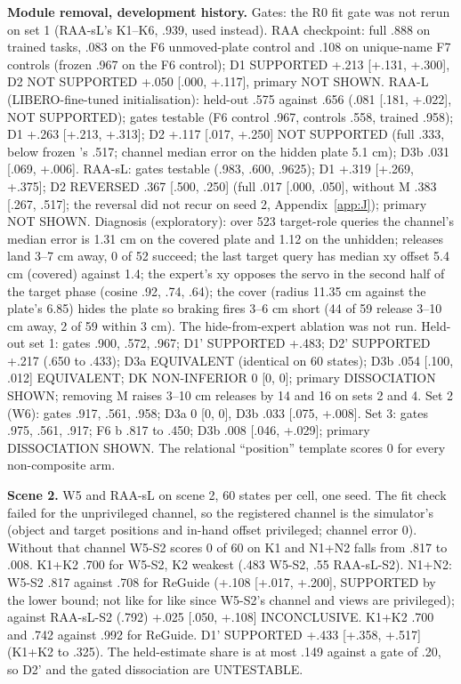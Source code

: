 \textbf{Module removal, development history.} Gates: the R0 fit gate was not rerun on set 1 (RAA-sL's K1--K6, .939, used instead). RAA checkpoint: full .888 on trained tasks, .083 on the F6 unmoved-plate control and .108 on unique-name F7 controls (frozen \pifive{} .967 on the F6 control); D1 SUPPORTED +.213 [+.131, +.300], D2 NOT SUPPORTED +.050 [.000, +.117], primary NOT SHOWN. RAA-L (LIBERO-fine-tuned initialisation): held-out .575 against .656 (\mi.081 [\mi.181, +.022], NOT SUPPORTED); gates testable (F6 control .967, controls .558, trained .958); D1 +.263 [+.213, +.313]; D2 +.117 [\mi.017, +.250] NOT SUPPORTED (full .333, below frozen \pifive's .517; channel median error on the hidden plate 5.1 cm); D3b \mi.031 [\mi.069, +.006]. RAA-sL: gates testable (.983, .600, .9625); D1 +.319 [+.269, +.375]; D2 REVERSED \mi.367 [\mi.500, \mi.250] (full .017 [.000, .050], without M .383 [.267, .517]; the reversal did not recur on seed 2, Appendix~\ref{app:J}); primary NOT SHOWN. Diagnosis (exploratory): over 523 target-role queries the channel's median error is 1.31 cm on the covered plate and 1.12 on the unhidden; releases land 3--7 cm away, 0 of 52 succeed; the last target query has median xy offset 5.4 cm (covered) against 1.4; the expert's xy opposes the servo in the second half of the target phase (cosine \mi.92, \mi.74, \mi.64); the cover (radius 11.35 cm against the plate's 6.85) hides the plate so braking fires 3--6 cm short (44 of 59 release 3--10 cm away, 2 of 59 within 3 cm). The hide-from-expert ablation was not run. Held-out set 1: gates .900, .572, .967; D1' SUPPORTED +.483; D2' SUPPORTED +.217 (.650 to .433); D3a EQUIVALENT (identical on 60 states); D3b \mi.054 [\mi.100, \mi.012] EQUIVALENT; DK NON-INFERIOR 0 [0, 0]; primary DISSOCIATION SHOWN; removing M raises 3--10 cm releases by 14 and 16 on sets 2 and 4. Set 2 (W6): gates .917, .561, .958; D3a 0 [0, 0], D3b \mi.033 [\mi.075, +.008]. Set 3: gates .975, .561, .917; F6 b .817 to .450; D3b \mi.008 [\mi.046, +.029]; primary DISSOCIATION SHOWN. The relational ``position'' template scores 0 for every non-composite arm.

\textbf{Scene 2.} W5 and RAA-sL on scene 2, 60 states per cell, one seed. The fit check failed for the unprivileged channel, so the registered channel is the simulator's (object and target positions and in-hand offset privileged; channel error 0). Without that channel W5-S2 scores 0 of 60 on K1 and N1+N2 falls from .817 to .008. K1+K2 .700 for W5-S2, K2 weakest (.483 W5-S2, .55 RAA-sL-S2). N1+N2: W5-S2 .817 against .708 for ReGuide (+.108 [+.017, +.200], SUPPORTED by the lower bound; not like for like since W5-S2's channel and views are privileged); against RAA-sL-S2 (.792) +.025 [\mi.050, +.108] INCONCLUSIVE. K1+K2 .700 and .742 against .992 for ReGuide. D1' SUPPORTED +.433 [+.358, +.517] (K1+K2 to .325). The held-estimate share is at most .149 against a gate of .20, so D2' and the gated dissociation are UNTESTABLE.

